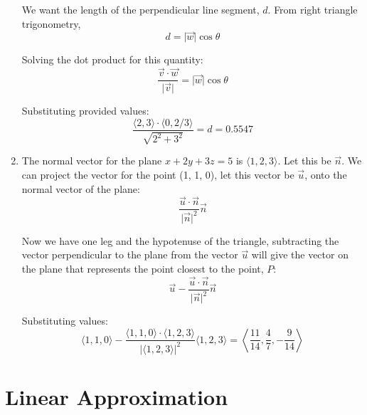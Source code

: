 \documentclass{article}
\begin{document}
\begin{enumerate}[1.]
    We want the length of the perpendicular line segment, $d$. From right
    triangle trigonometry,
    $$ d = \vert \vec{w} \vert \cos \theta $$

    Solving the dot product for this quantity:
    $$ \frac{ \vec{v} \cdot \vec{w} }{ \vert \vec{v} \vert } = \vert \vec{w}
    \vert \cos \theta$$

    Substituting provided values:
    $$ \frac{ \langle 2, 3 \rangle \cdot \langle 0, 2/3 \rangle }{ \sqrt{2^{2} +
    3^{2}} } = d = 0.5547$$

  \item The normal vector for the plane $x + 2y + 3z = 5$ is $\langle 1, 2, 3
    \rangle$. Let this be $\vec{n}$. We can project the vector for the point (1,
    1, 0), let this vector be $\vec{u}$, onto the normal vector of the plane:
    $$ \frac{ \vec{u} \cdot \vec{n} }{ \vert \vec{n} \vert^{2} }\vec{n} $$

    Now we have one leg and the hypotenuse of the triangle, subtracting the
    vector perpendicular to the plane from the vector $\vec{u}$ will give the
    vector on the plane that represents the point closest to the point, $P$:
    $$ \vec{u} - \frac{ \vec{u} \cdot \vec{n} }{ \vert \vec{n} \vert^{2} }\vec{n} $$

    Substituting values:
    $$ \langle 1, 1, 0 \rangle - \frac{ \langle 1, 1, 0 \rangle \cdot \langle 1,
    2, 3 \rangle }{ \vert \langle 1, 2, 3 \rangle \vert^{2} } \langle 1, 2, 3
    \rangle = \left\langle \frac{ 11 }{ 14 }, \frac{ 4 }{ 7 }, -\frac{ 9 }{ 14 }
      \right\rangle $$
\end{enumerate}

\section{Linear Approximation}
\end{document}
